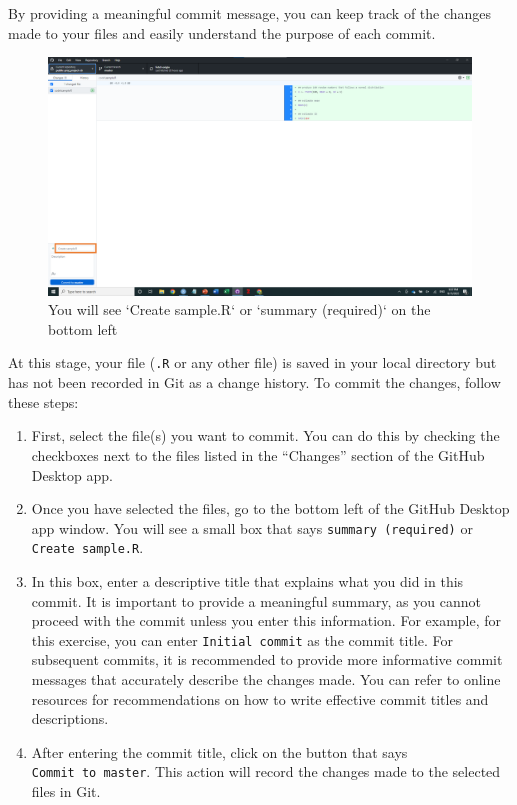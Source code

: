 \documentclass[
]{book}
\begin{document}
By providing a meaningful commit message, you can keep track of the changes made to your files and easily understand the purpose of each commit.

\begin{figure}

{\centering \includegraphics[width=61.11in]{image/git_image04} 

}

\caption{You will see `Create sample.R` or `summary (required)` on the bottom left}\label{fig:gitdesktop3}
\end{figure}

At this stage, your file (\texttt{.R} or any other file) is saved in your local directory but has not been recorded in Git as a change history. To commit the changes, follow these steps:

\begin{enumerate}
\def\labelenumi{\arabic{enumi}.}
\item
  First, select the file(s) you want to commit. You can do this by checking the checkboxes next to the files listed in the ``Changes'' section of the GitHub Desktop app.
\item
  Once you have selected the files, go to the bottom left of the GitHub Desktop app window. You will see a small box that says \texttt{summary\ (required)} or \texttt{Create\ sample.R}.
\item
  In this box, enter a descriptive title that explains what you did in this commit. It is important to provide a meaningful summary, as you cannot proceed with the commit unless you enter this information. For example, for this exercise, you can enter \texttt{Initial\ commit} as the commit title. For subsequent commits, it is recommended to provide more informative commit messages that accurately describe the changes made. You can refer to online resources for recommendations on how to write effective commit titles and descriptions.
\item
  After entering the commit title, click on the button that says \texttt{Commit\ to\ master}. This action will record the changes made to the selected files in Git.
\end{enumerate}
\end{document}
